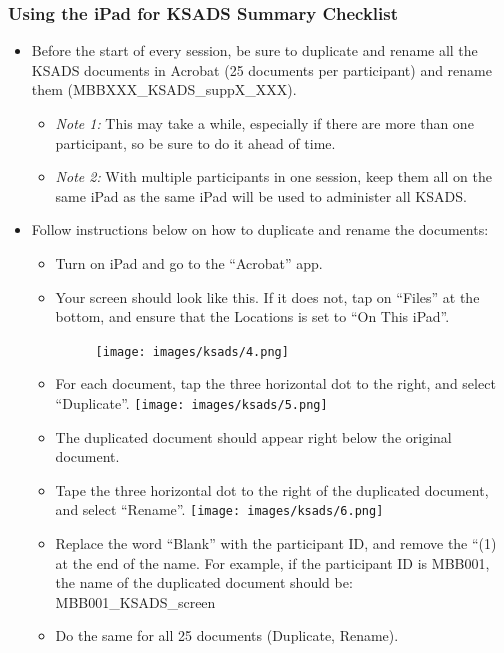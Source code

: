 \documentclass[
]{book}
\providecommand{\tightlist}{%
  \setlength{\itemsep}{0pt}\setlength{\parskip}{0pt}}
\begin{document}
\hypertarget{using-the-ipad-for-ksads-summary-checklist}{%
\subsubsection{Using the iPad for KSADS Summary Checklist}\label{using-the-ipad-for-ksads-summary-checklist}}

\begin{itemize}
\tightlist
\item
  Before the start of every session, be sure to duplicate and rename all the KSADS documents in Acrobat (25 documents per participant) and rename them (MBBXXX\_KSADS\_suppX\_XXX).

  \begin{itemize}
  \tightlist
  \item
    \emph{Note 1:} This may take a while, especially if there are more than one participant, so be sure to do it ahead of time.
  \item
    \emph{Note 2:} With multiple participants in one session, keep them all on the same iPad as the same iPad will be used to administer all KSADS.
  \end{itemize}
\item
  Follow instructions below on how to duplicate and rename the documents:

  \begin{itemize}
  \item
    Turn on iPad and go to the ``Acrobat'' app.
  \item
    Your screen should look like this. If it does not, tap on ``Files'' at the bottom, and ensure that the Locations is set to ``On This iPad''.

    \begin{figure}
    \centering
    \texttt{[image: images/ksads/4.png]}
    \caption{}
    \end{figure}
  \item
    For each document, tap the three horizontal dot to the right, and select ``Duplicate''.
    \texttt{[image: images/ksads/5.png]}
  \item
    The duplicated document should appear right below the original document.
  \item
    Tape the three horizontal dot to the right of the duplicated document, and select ``Rename''.
    \texttt{[image: images/ksads/6.png]}
  \item
    Replace the word ``Blank'' with the participant ID, and remove the ``(1) at the end of the name. For example, if the participant ID is MBB001, the name of the duplicated document should be: MBB001\_KSADS\_screen
  \item
    Do the same for all 25 documents (Duplicate, Rename).
  \end{itemize}
\end{itemize}
\end{document}
